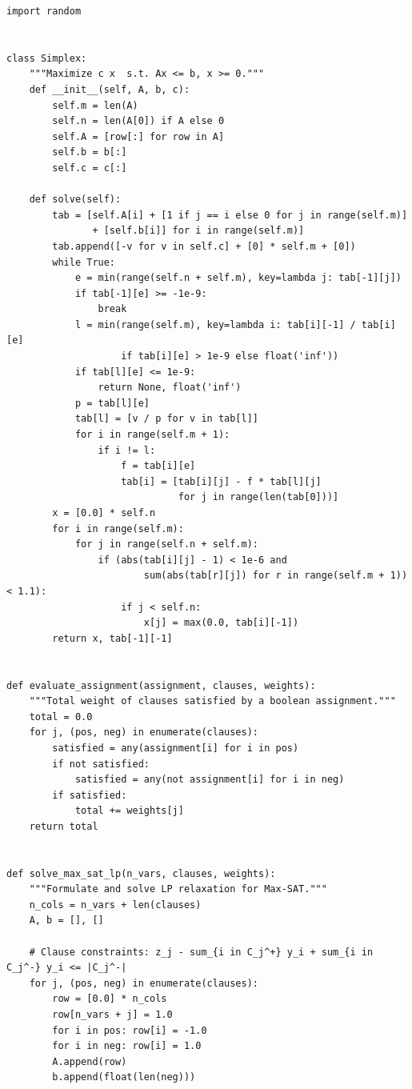 \begin{lstlisting}[style=python, caption=Randomized Rounding for Max-SAT]
import random


class Simplex:
    """Maximize c x  s.t. Ax <= b, x >= 0."""
    def __init__(self, A, b, c):
        self.m = len(A)
        self.n = len(A[0]) if A else 0
        self.A = [row[:] for row in A]
        self.b = b[:]
        self.c = c[:]

    def solve(self):
        tab = [self.A[i] + [1 if j == i else 0 for j in range(self.m)]
               + [self.b[i]] for i in range(self.m)]
        tab.append([-v for v in self.c] + [0] * self.m + [0])
        while True:
            e = min(range(self.n + self.m), key=lambda j: tab[-1][j])
            if tab[-1][e] >= -1e-9:
                break
            l = min(range(self.m), key=lambda i: tab[i][-1] / tab[i][e]
                    if tab[i][e] > 1e-9 else float('inf'))
            if tab[l][e] <= 1e-9:
                return None, float('inf')
            p = tab[l][e]
            tab[l] = [v / p for v in tab[l]]
            for i in range(self.m + 1):
                if i != l:
                    f = tab[i][e]
                    tab[i] = [tab[i][j] - f * tab[l][j]
                              for j in range(len(tab[0]))]
        x = [0.0] * self.n
        for i in range(self.m):
            for j in range(self.n + self.m):
                if (abs(tab[i][j] - 1) < 1e-6 and
                        sum(abs(tab[r][j]) for r in range(self.m + 1)) < 1.1):
                    if j < self.n:
                        x[j] = max(0.0, tab[i][-1])
        return x, tab[-1][-1]


def evaluate_assignment(assignment, clauses, weights):
    """Total weight of clauses satisfied by a boolean assignment."""
    total = 0.0
    for j, (pos, neg) in enumerate(clauses):
        satisfied = any(assignment[i] for i in pos)
        if not satisfied:
            satisfied = any(not assignment[i] for i in neg)
        if satisfied:
            total += weights[j]
    return total


def solve_max_sat_lp(n_vars, clauses, weights):
    """Formulate and solve LP relaxation for Max-SAT."""
    n_cols = n_vars + len(clauses)
    A, b = [], []
    
    # Clause constraints: z_j - sum_{i in C_j^+} y_i + sum_{i in C_j^-} y_i <= |C_j^-|
    for j, (pos, neg) in enumerate(clauses):
        row = [0.0] * n_cols
        row[n_vars + j] = 1.0
        for i in pos: row[i] = -1.0
        for i in neg: row[i] = 1.0
        A.append(row)
        b.append(float(len(neg)))
        

\end{lstlisting}
